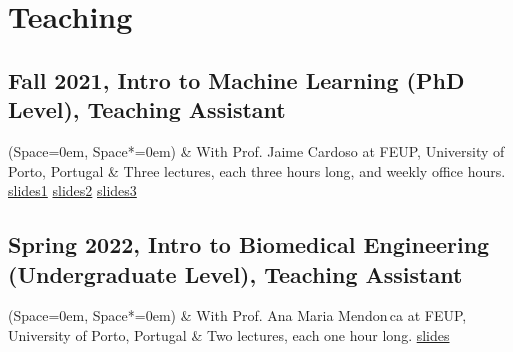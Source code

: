 \documentclass[10pt,letterpaper,pdf]{article}
\begin{document}
\nocite{*}

\printbibliography[keyword={journal}, title={Journal Publications (Peer-Reviewed) }, prenote=mynote]
\printbibliography[keyword={conference}, title={Conference Publications (Peer-Reviewed)}]
\printbibliography[keyword={patent}, title={Patents}]
\printbibliography[keyword={invitedtalk}, title={Invited Talks}]

\section{Teaching}
\subsection{\small Fall 2021, Intro to Machine Learning (PhD Level), Teaching Assistant}
\begin{easylist} \ListProperties(Space=0em, Space*=0em)
    & With Prof. Jaime Cardoso at FEUP, University of Porto, Portugal
    & Three lectures, each three hours long, and weekly office hours. \href{https://docs.google.com/presentation/d/1joBU3QM3jcpMYBDeFdvwiuDHdXrLZweiAiW1BgXMN7E/edit?usp=sharing}{slides1} \href{https://docs.google.com/presentation/d/1OkectcY5ImaDDD-a2M4ZRNoKgxxkM5DyoJ3oRK_vKn8/edit?usp=sharing}{slides2} \href{https://docs.google.com/presentation/d/14uhYMDF_xdyQosnJnFvr8sqUh31SGAtaN7V4Ob6f13Q/edit?usp=sharing}{slides3}
\end{easylist}

\subsection{\small Spring 2022, Intro to Biomedical Engineering (Undergraduate
Level), Teaching Assistant}
\begin{easylist} \ListProperties(Space=0em, Space*=0em)
    & With Prof. Ana Maria Mendon{\,c}a at FEUP, University of Porto, Portugal
    & Two lectures, each one hour long.  \href{https://docs.google.com/presentation/d/1lco5nlckinGk8RVHosJapeGzfjR6MUC9TbwOuRjUSms/edit?usp=sharing}{slides}
\end{easylist}

\end{document}
